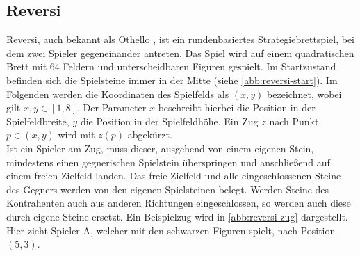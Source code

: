 \documentclass[12pt,a4paper,bibliography=totocnumbered,listof=totocnumbered]{article}
\begin{document}
\subsection{Reversi}
Reversi, auch bekannt als Othello \cite[S. 31]{Russell.2012}, ist ein rundenbasiertes Strategiebrettspiel, bei dem zwei Spieler gegeneinander antreten. Das Spiel wird auf einem quadratischen Brett mit 64 Feldern und unterscheidbaren Figuren gespielt. Im Startzustand befinden sich die Spielsteine immer in der Mitte (siehe \autoref{abb:reversi-start}). Im Folgenden werden die Koordinaten des Spielfelds als $(x, y)$ bezeichnet, wobei gilt $x,y \in [1,8]$. Der Parameter $x$ beschreibt hierbei die Position in der Spielfeldbreite, $y$ die Position in der Spielfeldhöhe. Ein Zug $z$ nach Punkt $p \in (x, y)$ wird mit $z(p)$ abgekürzt. \\
Ist ein Spieler am Zug, muss dieser, ausgehend von einem eigenen Stein, mindestens einen gegnerischen Spielstein überspringen und anschließend auf einem freien Zielfeld landen. Das freie Zielfeld und alle eingeschlossenen Steine des Gegners werden von den eigenen Spielsteinen belegt. Werden Steine des Kontrahenten auch aus anderen Richtungen eingeschlossen, so werden auch diese durch eigene Steine ersetzt. Ein Beispielzug wird in \autoref{abb:reversi-zug} dargestellt. Hier zieht Spieler A, welcher mit den schwarzen Figuren spielt, nach Position $(5,3)$.
\end{document}
